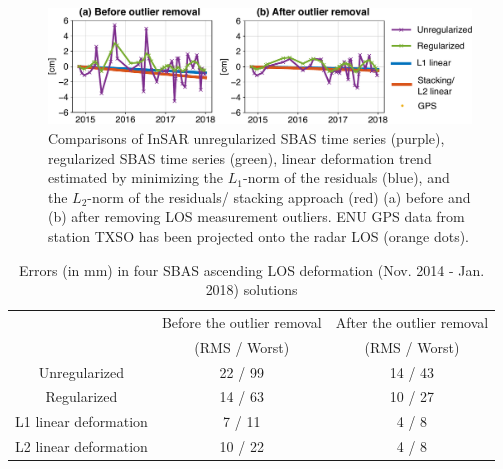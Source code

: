 \begin{figure}
	\centering
	\includegraphics[width=\textwidth]{figures/chapter4-grl/supplement/figureS5-compare-insar-2panel.pdf}
	\caption[Comparisons of InSAR SBAS solutions]{Comparisons of InSAR unregularized SBAS time series (purple), regularized SBAS time series (green), linear deformation trend estimated by minimizing the $L_1$-norm of the residuals (blue), and the $L_2$-norm of the residuals/ stacking approach (red)  (a) before and (b) after removing LOS measurement outliers. ENU GPS data from station TXSO has been projected onto the radar LOS (orange dots).}
	\label{fig:compare}
\end{figure}


\begin{table}
	\caption{Errors (in mm) in four SBAS ascending LOS deformation (Nov. 2014 - Jan. 2018) solutions}
	\centering
	\begin{tabular}{|c|c|c|}
		\hline 
		& Before the outlier removal & After the outlier removal \\
		& (RMS / Worst) & (RMS / Worst) \\
		\hline
		Unregularized &  22 / 99     &  14 / 43         \\\hline
		Regularized   &    14 / 63   &   10  / 27       \\\hline
		L1 linear deformation          &   7 / 11      & 4 / 8      \\\hline
		L2 linear deformation          &   10 / 22        & 4 / 8      \\\hline
	\end{tabular}
	\label{tab:compare-errors}
\end{table}





